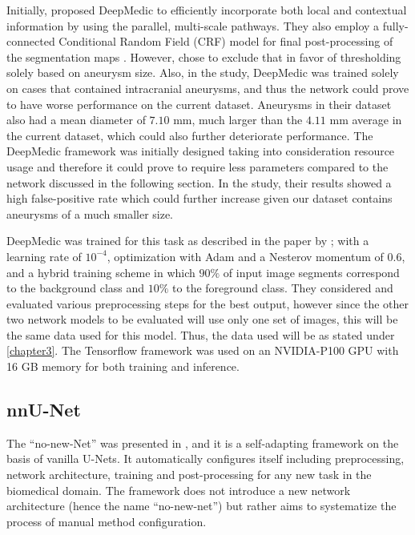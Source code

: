 
Initially, \citeauthor{Kamnitsas2017} proposed DeepMedic to efficiently incorporate both local and contextual information by using the parallel, multi-scale pathways. They also employ a fully-connected Conditional Random Field (CRF) model for final post-processing of the segmentation maps \cite{Krahenbuhl2012}. However, \citeauthor{Sichermann2019} chose to exclude that in favor of thresholding solely based on aneurysm size. Also, in the study, DeepMedic was trained solely on cases that contained intracranial aneurysms, and thus the network could prove to have worse performance on the current dataset. Aneurysms in their dataset also had a mean diameter of $7.10$ mm, much larger than the $4.11$ mm average in the current dataset, which could also further deteriorate performance. The DeepMedic framework was initially designed taking into consideration resource usage and therefore it could prove to require less parameters compared to the network discussed in the following section. In the study, their results showed a high false-positive rate which could further increase given our dataset contains aneurysms of a much smaller size.

DeepMedic was trained for this task as described in the paper by \citeauthor{Sichermann2019}; with a learning rate of $10^{-4}$, optimization with Adam and a Nesterov momentum of $0.6$, and a hybrid training scheme in which $90\%$ of input image segments correspond to the background class and $10\%$ to the foreground class. They considered and evaluated various preprocessing steps for the best output, however since the other two network models to be evaluated will use only one set of images, this will be the same data used for this model. Thus, the data used will be as stated under \ref{chapter3}. The Tensorflow framework was used on an NVIDIA-P100 GPU with 16 GB memory for both training and inference. 

\subsection{nnU-Net}
The ``no-new-Net'' was presented in \citeyear{nnUnet}, and it is a self-adapting framework on the basis of vanilla U-Nets. It automatically configures itself including preprocessing, network architecture, training and post-processing for any new task in the biomedical domain. The framework does not introduce a new network architecture (hence the name ``no-new-net'') but rather aims to systematize the process of manual method configuration.

